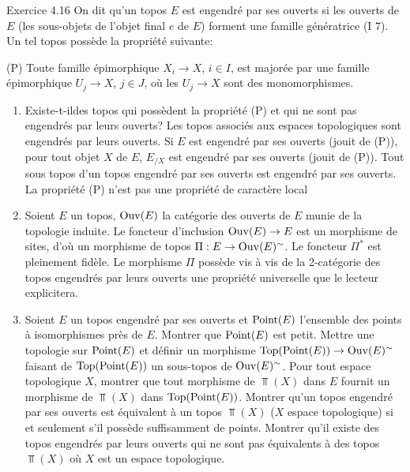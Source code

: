\documentclass[10pt]{../fichiers-configuration-latex/smfart}
\begin{document}
\begin{enonce*}[remark]{Exercice 4.16}
On dit qu'un topos $E$ est engendré par ses ouverts si les ouverts
de $E$ (\ie les sous-objets de l'objet final $e$ de $E$) forment une
famille génératrice (I 7). Un tel topos possède la propriété
suivante:

\noindent
(P) Toute famille épimorphique $X_i \to X$, $i \in I$, est
majorée par une famille épimorphique $U_j \to X$, $j \in J$, où
les $U_j \to X$ sont des monomorphismes.

\begin{enumerate}
\renewcommand{\theenumi}{\alph{enumi}}
\renewcommand{\labelenumi}{\theenumi)}
\item Existe-t-il\pageoriginale des topos qui possèdent la propriété (P) et
  qui ne sont pas engendrés par leurs ouverts? Les topos associés
  aux espaces topologiques sont engendrés par leurs ouverts. Si $E$
  est engendré par ses ouverts (\resp jouit de (P)), pour tout objet
  $X$ de $E$, $E_{/X}$ est engendré par ses ouverts (\resp jouit de
  (P)). Tout sous topos d'un topos engendré par ses ouverts est
  engendré par ses ouverts. La propriété (P) n'est pas une
  propriété de caractère local

\item Soient $E$ un topos, $\operatorname{Ouv}(E)$ la catégorie des ouverts de $E$
  munie de la topologie induite. Le foncteur d'inclusion $\Ouv(E)\to
  E$ est un morphisme de sites, d'où un morphisme de topos
  $\Pi:E\to\Ouv(E)^{\sim}$. Le foncteur $\Pi^{\ast}$ est pleinement
  fidèle. Le morphisme $\Pi$ possède vis à vis de la 2-catégorie des
  topos engendrés par leurs ouverts une propriété universelle que le
  lecteur explicitera.

\item Soient $E$ un topos engendré par ses ouverts et $\operatorname{Point}(E)$
  l'ensemble des points à isomorphismes près de $E$. Montrer que
  $\operatorname{Point}(E)$ est petit. Mettre une topologie sur $\operatorname{Point}(E)$ et définir
  un morphisme $\Top(\Point(E)) \to \Ouv(E)^{\sim}$ faisant de
  $\operatorname{Top}(\operatorname{Point}(E))$ un sous-topos de $\operatorname{Ouv}(E)^{\sim}$. Pour tout espace
  topologique $X$, montrer que tout morphisme de $\Top(X)$ dans $E$
  fournit un morphisme de $\Top(X)$ dans $\operatorname{Top}(\operatorname{Point}(E))$. Montrer
  qu'un topos engendré par ses ouverts est équivalent à un topos
  $\Top(X)$ ($X$ espace topologique) si et seulement s'il possède
  suffisamment de points. Montrer qu'il existe des topos engendrés
  par leurs ouverts qui ne sont pas équivalents à des topos
  $\Top(X)$ où $X$ est un espace topologique.


\end{enumerate}
\end{enonce*}
\end{document}
